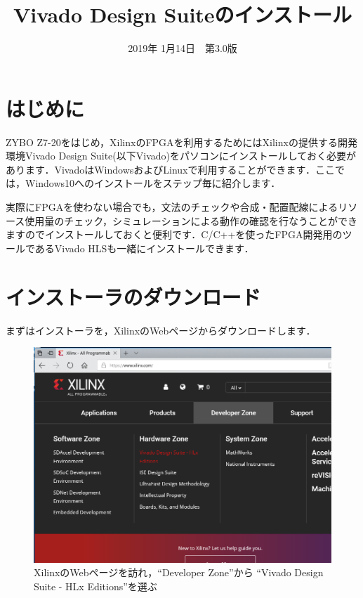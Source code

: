\documentclass[a4paper,dvipdfmx]{jsarticle}
\begin{document}
\title{Vivado Design Suiteのインストール}
\author{}
\date{2019年 1月14日~~第3.0版}
\maketitle

 \section{はじめに}

 ZYBO Z7-20をはじめ，XilinxのFPGAを利用するためにはXilinxの提供する開発環境Vivado Design Suite(以下Vivado)をパソコンにインストールしておく必要があります．VivadoはWindowsおよびLinuxで利用することができます．ここでは，Windows10へのインストールをステップ毎に紹介します．

 実際にFPGAを使わない場合でも，文法のチェックや合成・配置配線によるリソース使用量のチェック，シミュレーションによる動作の確認を行なうことができますのでインストールしておくと便利です．C/C++を使ったFPGA開発用のツールであるVivado HLSも一緒にインストールできます．

 \section{インストーラのダウンロード}
 まずはインストーラを，XilinxのWebページからダウンロードします．

 \begin{figure}[H]
  \begin{center}
   \includegraphics[width=.9\textwidth]{appendix_figures/01_xilinx_web_page.png}
  \end{center}
  \caption{XilinxのWebページを訪れ，``Developer Zone''から ``Vivado Design Suite - HLx Editions''を選ぶ}
 \end{figure}
\end{document}
